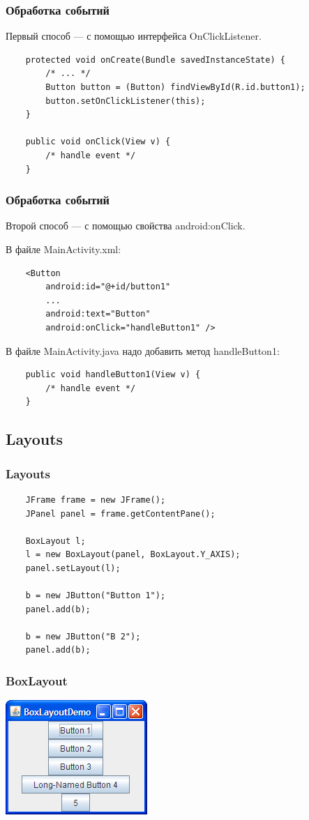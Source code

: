 \begin{frame}[fragile]
	\frametitle{Обработка событий}
	Первый способ --- с помощью интерфейса OnClickListener.

	\medskip
	\begin{verbatim}
	protected void onCreate(Bundle savedInstanceState) {
	    /* ... */
	    Button button = (Button) findViewById(R.id.button1);
	    button.setOnClickListener(this);
	}

	public void onClick(View v) {
	    /* handle event */
	}
	\end{verbatim}
\end{frame}

\begin{frame}[fragile]
	\frametitle{Обработка событий}
	Второй способ --- с помощью свойства android:onClick.

	\medskip
	В файле MainActivity.xml:
	\begin{verbatim}
	<Button
	    android:id="@+id/button1"
	    ...
	    android:text="Button"
	    android:onClick="handleButton1" />
	\end{verbatim}

	В файле MainActivity.java надо добавить метод handleButton1:
	\begin{verbatim}
	public void handleButton1(View v) {
	    /* handle event */
	}
	\end{verbatim}

\end{frame}

\subsection{Layouts}

\begin{frame}[fragile]
	\frametitle{Layouts}
	\begin{verbatim}
	JFrame frame = new JFrame();
	JPanel panel = frame.getContentPane();

	BoxLayout l;
	l = new BoxLayout(panel, BoxLayout.Y_AXIS);
	panel.setLayout(l);

	b = new JButton("Button 1");
	panel.add(b);

	b = new JButton("B 2");
	panel.add(b);
	\end{verbatim}
\end{frame}



\begin{frame}[fragile]
	\frametitle{BoxLayout}
	\includegraphics[scale=1]{BoxLayoutDemo.png}
\end{frame}

